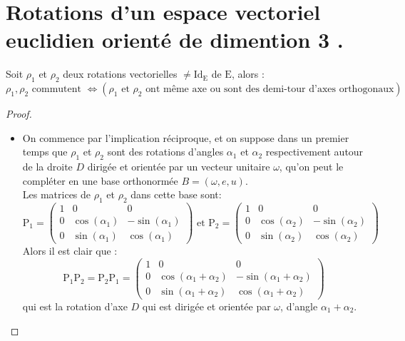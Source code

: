 \section{Rotations d'un espace vectoriel euclidien orienté de dimention 3 .}
\begin{prop}\label{prop1}
  Soit $\rho_1$ et $\rho_2$ deux rotations vectorielles $\neq \mathrm{Id_E}$ de $\mathrm{E}$, alors :
  $$\rho_1, \rho_2 \text{ commutent } \Leftrightarrow (\text{$\rho_1$ et $\rho_2$ ont même axe ou sont des demi-tour d'axes orthogonaux})$$
\end{prop}
\begin{proof}
\hfill
\begin{itemize}
  \item On commence par l'implication réciproque, et on suppose dans un premier temps que $\rho_1$ et $\rho_2$ sont des rotations  d'angles $\alpha_1$ et $\alpha_2$ respectivement autour de la droite $D$ dirigée et orientée par un vecteur unitaire $\omega$, qu'on peut le compléter en une base orthonormée $B = (\omega, e, u)$.\\ Les matrices de $\rho_1$ et $\rho_2$ dans cette base sont:
  \[
  \mathrm{P}_1=
  \begin{pmatrix}
  1 & 0 & 0\\
  0 & \cos(\alpha_1) & -\sin(\alpha_1) \\
  0 & \sin(\alpha_1) & \cos(\alpha_1)
  \end{pmatrix}
  \text{ et }
  \mathrm{P}_2=
  \begin{pmatrix}
  1 & 0 & 0\\
  0 & \cos(\alpha_2) & -\sin(\alpha_2) \\
  0 & \sin(\alpha_2) & \cos(\alpha_2)
  \end{pmatrix}
  \]
  Alors il est clair que :
  \[
   \mathrm{P}_1 \mathrm{P}_2=\mathrm{P}_2 \mathrm{P}_1=
   \begin{pmatrix}
   1 & 0 & 0\\
   0 & \cos(\alpha_1+\alpha_2) & -\sin(\alpha_1+\alpha_2) \\
   0 & \sin(\alpha_1+\alpha_2) & \cos(\alpha_1+\alpha_2)
   \end{pmatrix}
   \]
   qui est la rotation d'axe $D$ qui est dirigée et orientée par $\omega$, d'angle $\alpha_1 + \alpha_2$.

  \begin{center}
\end{center}
\end{itemize}
\end{proof}
